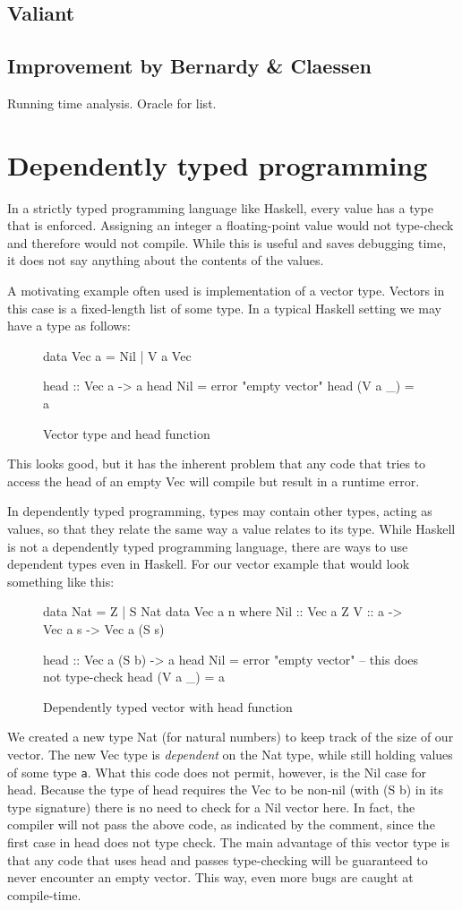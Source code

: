 \documentclass[a4paper,12pt,twosided]{report}
\begin{document}
\subsection{Valiant}
\subsection{Improvement by Bernardy \& Claessen}
Running time analysis. Oracle for list.

\section{Dependently typed programming}
In a strictly typed programming language like Haskell, every value has a type
that is enforced. Assigning an integer a floating-point value would not
type-check and therefore would not compile. While this is useful and saves
debugging time, it does not say anything about the contents of the values.

A motivating example often used is implementation of a vector type. Vectors in
this case is a fixed-length list of some type. In a typical Haskell setting we 
may have a type as follows:
\begin{figure}[H]
\begin{code}
data Vec a = Nil | V a Vec

head :: Vec a -> a
head Nil = error "empty vector"
head (V a _) = a
\end{code}
\caption{Vector type and head function}
\end{figure}
This looks good, but it has the inherent problem that any code that tries to
access the head of an empty Vec will compile but result in a runtime error. 

In dependently typed programming, types may contain other types, acting as
values, so that they relate the same way a value relates to its type. While
Haskell is not a dependently typed programming language, there are ways to use
dependent types even in Haskell. For our vector example that would look
something like this:
\begin{figure}[H]
\begin{code}
data Nat = Z | S Nat
data Vec a n where
    Nil :: Vec a Z
    V :: a -> Vec a s -> Vec a (S s)

head :: Vec a (S b) -> a
head Nil = error "empty vector" -- this does not type-check
head (V a _) = a
\end{code}
\caption{Dependently typed vector with head function}
\end{figure}
We created a new type Nat (for natural numbers) to keep track of the size of our
vector. The new Vec type is \textit{dependent} on the Nat type, while still
holding values of some type \texttt{a}. What this code does not permit, however,
is the Nil case for head. Because the type of head requires the Vec to be
non-nil (with (S b) in its type signature) there is no need to check for a Nil
vector here. In fact, the compiler will not pass the above code, as indicated by
the comment, since the first case in head does not type check. The main
advantage of this vector type is that any code that uses head and passes
type-checking will be guaranteed to never encounter an empty vector.  This way,
even more bugs are caught at compile-time.
\end{document}
